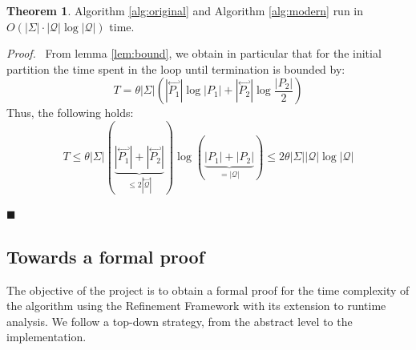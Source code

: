 \documentclass[12pt, a4 paper]{article}
\renewenvironment{proof}[1][Proof]{\begin{mdframed}[backgroundcolor=black!5, topline=false, rightline=false, bottomline=false, linecolor=black!15, linewidth=3pt]{\noindent\textit{#1.}\ }}{\noindent\par\hfill$\blacksquare$\end{mdframed}}
\theoremstyle{definition}
\newtheorem{theorem}{Theorem}
\begin{document}
\begin{theorem}
    \label{thm:complexity}
    Algorithm \ref{alg:original} and Algorithm \ref{alg:modern} run in $O\left(|\Sigma|\cdot|\mathcal{Q}| \log |\mathcal{Q}|\right)$ time.
\end{theorem}
\begin{proof}
From lemma \ref{lem:bound}, we obtain in particular that for the initial partition the time spent in the loop until termination is bounded by:
$$T = \theta |\Sigma| \left(| \overset{\hookleftarrow}{P_1} | \log | P_1 | + | \overset{\hookleftarrow}{P_2} | \log \frac{| P_2 |}{2}\right)$$
Thus, the following holds:
$$T \leq \theta |\Sigma| (\underset{\leq 2|\overset{\hookleftarrow}{\mathcal{Q}}|}{\underbrace{|\overset{\hookleftarrow}{P_1}| + |\overset{\hookleftarrow}{P_2}|}})\log(\underset{= |\mathcal{Q}|}{\underbrace{|P_1| + |P_2|}}) \leq 2 \theta|\Sigma||\mathcal{Q}| \log |\mathcal{Q}|$$
\end{proof}

\subsection{Towards a formal proof}
The objective of the project is to obtain a formal proof for the time complexity of the algorithm using the Refinement Framework with its extension to runtime analysis.
We follow a top-down strategy, from the abstract level to the implementation.
\end{document}
